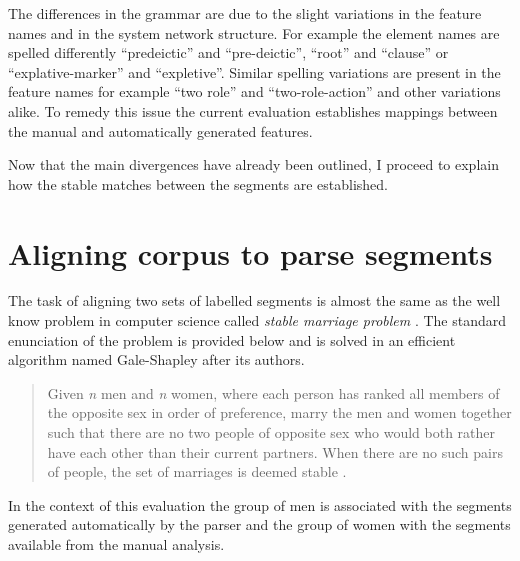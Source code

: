 The differences in the grammar are due to the slight variations in the feature names and in the system network structure. For example the element names are spelled differently ``predeictic'' and ``pre-deictic'', ``root'' and ``clause'' or ``explative-marker'' and ``expletive''. Similar spelling variations are present in the feature names for example ``two role'' and ``two-role-action'' and other variations alike. To remedy this issue the current evaluation establishes mappings between the manual and automatically generated features. 

Now that the main divergences have already been outlined, I proceed to explain how the stable matches between the segments are established.

\section{Aligning corpus to parse segments}
\label{sec:stable-marriage}
The task of aligning two sets of labelled segments is almost the same as the well know problem in computer science called \textit{stable marriage problem} \citep{Gusfield1989}. The standard enunciation of the problem is provided below and is solved in an efficient algorithm named Gale-Shapley \citep{Gale1962} after its authors.

\begin{quotation}
    Given \textit{n} men and \textit{n} women, where each person has ranked all members of the opposite sex in order of preference, marry the men and women together such that there are no two people of opposite sex who would both rather have each other than their current partners. When there are no such pairs of people, the set of marriages is deemed stable \citet{iwama2008}.
\end{quotation}


In the context of this evaluation the group of men is associated with the segments generated automatically  by the parser and the group of women with the segments available from the manual analysis. 

